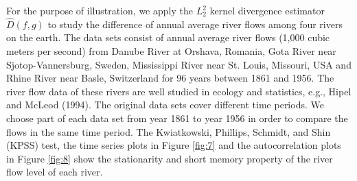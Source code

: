 \documentclass[11pt]{article}
\begin{document}
For the purpose of illustration, we apply the $L^2_2$ kernel divergence estimator $\widehat{D}(f,g)$ to study the difference of annual average river flows among four rivers on the earth.  The data sets consist of annual average river flows (1,000 cubic meters per second) from  Danube River at Orshava, Romania, Gota River near Sjotop-Vannersburg, Sweden,  Mississippi River near St. Louis, Missouri, USA and Rhine River near Basle, Switzerland for 96 years between 1861 and 1956. The river flow data of these rivers are well studied in ecology and statistics, e.g., Hipel and McLeod (1994). 
The original data sets cover different time periods.  We choose part of each data set from year 1861 to year 1956 in order to compare the flows in the same time period.  
The Kwiatkowski, Phillips, Schmidt, and Shin (KPSS) test, the time series plots in Figure \ref{fig:7} and the autocorrelation plots in Figure \ref{fig:8} show the stationarity and short memory property of the river flow level of each river. 
\end{document}
